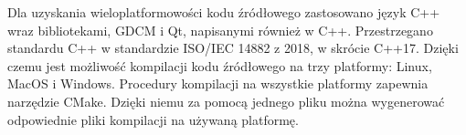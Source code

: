 \par
Dla uzyskania wieloplatformowości kodu źródłowego zastosowano język C++ wraz bibliotekami, GDCM i Qt, napisanymi również w C++.
Przestrzegano standardu C++ w standardzie ISO/IEC 14882 z 2018, w skrócie C++17.
Dzięki czemu jest możliwość kompilacji kodu źródłowego na trzy platformy: Linux, MacOS i Windows.
Procedury kompilacji na wszystkie platformy zapewnia narzędzie CMake.
Dzięki niemu za pomocą jednego pliku można wygenerować odpowiednie pliki kompilacji na używaną platformę.
